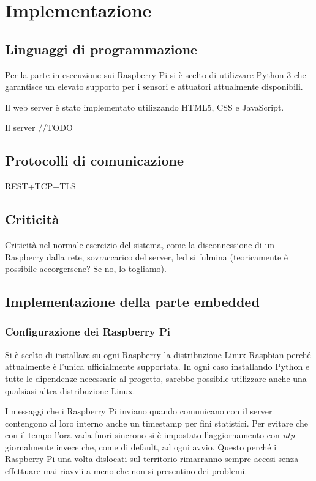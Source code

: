 \chapter{Implementazione}

\section{Linguaggi di programmazione}

Per la parte in esecuzione sui Raspberry Pi si è scelto di utilizzare Python 3 che garantisce un elevato supporto per i sensori e attuatori attualmente disponibili.

Il web server è stato implementato utilizzando HTML5, CSS e JavaScript.

Il server //TODO

\section{Protocolli di comunicazione}

REST+TCP+TLS

\section{Criticità}

Criticità nel normale esercizio del sistema, come la disconnessione di un Raspberry dalla rete, sovraccarico del server, led si fulmina (teoricamente è possibile accorgersene? Se no, lo togliamo).

\section{Implementazione della parte embedded}

\subsection{Configurazione dei Raspberry Pi}

Si è scelto di installare su ogni Raspberry la distribuzione Linux Raspbian perché attualmente è l'unica ufficialmente supportata.
In ogni caso installando Python e tutte le dipendenze necessarie al progetto, sarebbe possibile utilizzare anche una qualsiasi altra distribuzione Linux.

I messaggi che i Raspberry Pi inviano quando comunicano con il server contengono al loro interno anche un timestamp per fini statistici.
Per evitare che con il tempo l'ora vada fuori sincrono si è impostato l'aggiornamento con \textit{ntp} giornalmente invece che, come di default, ad ogni avvio.
Questo perché i Raspberry Pi una volta dislocati sul territorio rimarranno sempre accesi senza effettuare mai riavvii a meno che non si presentino dei problemi.


